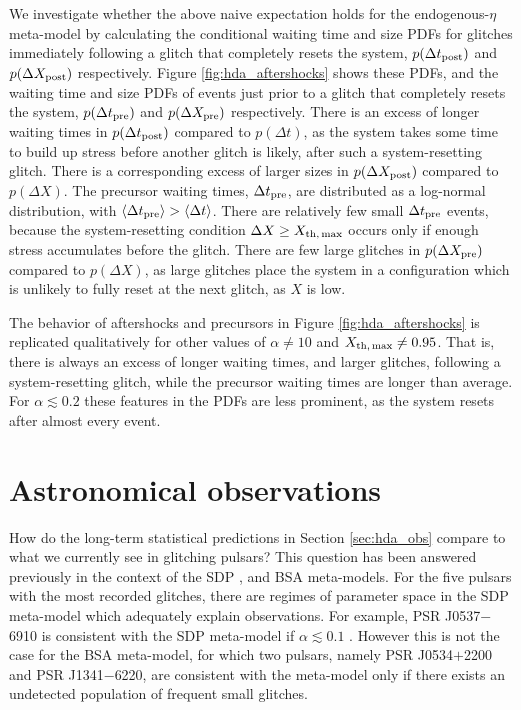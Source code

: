 We investigate whether the above naive expectation holds for the endogenous-$\eta$ meta-model by calculating the conditional waiting time and size PDFs for glitches immediately following a glitch that completely resets the system, $p(\Delta t_{\rm post})$ and $p(\Delta X_{\rm post})$ respectively. Figure \ref{fig:hda_aftershocks} shows these PDFs, and the waiting time and size PDFs of events just prior to a glitch that completely resets the system, $p(\Delta t_{\rm pre})$ and $p(\Delta X_{\rm pre})$ respectively. There is an excess of longer waiting times in $p(\Delta t_{\rm post})$ compared to $p(\Delta t)$, as the system takes some time to build up stress before another glitch is likely, after such a system-resetting glitch. There is a corresponding excess of larger sizes in $p(\Delta X_{\rm post})$ compared to $p(\Delta X)$. The precursor waiting times, $\Delta t_{\rm pre}$, are distributed as a log-normal distribution, with $\langle\Delta t_{\rm pre}\rangle > \langle \Delta t \rangle$. There are relatively few small $\Delta t_{\rm pre}$ events, because the system-resetting condition $\Delta X \geq X_{\rm th,\,max}$ occurs only if enough stress accumulates before the glitch. There are few large glitches in $p(\Delta X_{\rm pre})$ compared to $p(\Delta X)$, as large glitches place the system in a configuration which is unlikely to fully reset at the next glitch, as $X$ is low. 

The behavior of aftershocks and precursors in Figure \ref{fig:hda_aftershocks} is replicated qualitatively for other values of $\alpha \neq 10$ and $X_{\rm th,\,max} \neq 0.95$. That is, there is always an excess of longer waiting times, and larger glitches, following a system-resetting glitch, while the precursor waiting times are longer than average. For $\alpha \lesssim 0.2$ these features in the PDFs are less prominent, as the system resets after almost every event. 


\section{Astronomical observations} \label{sec:hda_disc}
How do the long-term statistical predictions in Section \ref{sec:hda_obs} compare to what we currently see in glitching pulsars? This question has been answered previously in the context of the SDP \citep{Melatos2018, Carlin2019quasi, Carlin2019ac}, and BSA \citep{Carlin2020bsa} meta-models. For the five pulsars with the most recorded glitches, there are regimes of parameter space in the SDP meta-model which adequately explain observations. For example, PSR J0537$-$6910 is consistent with the SDP meta-model if $\alpha \lesssim 0.1$ \citep{Carlin2019ac}. However this is not the case for the BSA meta-model, for which two pulsars, namely PSR J0534$+$2200 and PSR J1341$-$6220, are consistent with the meta-model only if there exists an undetected population of frequent small glitches. 

